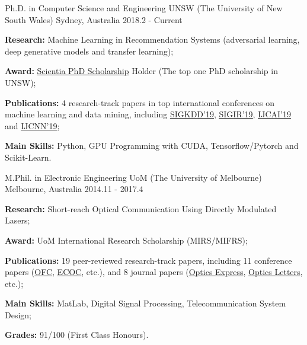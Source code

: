 

\begin{cventries}

  \cventry
    {Ph.D. in Computer Science and Engineering} %
    {UNSW (The University of New South Wales)} %
    {Sydney, Australia} %
    {2018.2 - Current} %
    {
      \begin{cvitems} %
        \item \textbf{Research:} Machine Learning in Recommendation Systems (adversarial learning, deep generative models and transfer learning);
        \item \textbf{Award:} \href{https://www.scientia.unsw.edu.au/scientia-phd-scholarships}{\underline{Scientia PhD Scholarship}} Holder (The top one PhD scholarship in UNSW);
        \item \textbf{Publications:}  4 research-track papers in top international conferences on machine learning and data mining, including \href{https://www.kdd.org/kdd2019/}{\underline{SIGKDD'19}}, \href{https://sigir.org/sigir2019/}{\underline{SIGIR'19}}, \href{https://ijcai19.org/}{\underline{IJCAI'19}} and \href{https://www.ijcnn.org/}{\underline{IJCNN'19}};
        \item \textbf{Main Skills:} Python, GPU Programming with CUDA, Tensorflow/Pytorch and Scikit-Learn.
      \end{cvitems}
    }

  \cventry%
    {M.Phil. in Electronic Engineering}%
    {UoM (The University of Melbourne)}%
    {Melbourne, Australia}%
    {2014.11 - 2017.4}%
    {
      \begin{cvitems}
        \item \textbf{Research:} Short-reach Optical Communication Using Directly Modulated Lasers;
        \item \textbf{Award:} UoM International Research Scholarship (MIRS/MIFRS);
        \item \textbf{Publications:} 19 peer-reviewed research-track papers, including 11 conference papers (\href{https://www.ofcconference.org/en-us/home/}{OFC}, \href{https://www.ecocexhibition.com/conference/}{ECOC}, etc.), and 8 journal papers (\href{https://www.osapublishing.org/oe/home.cfm}{Optics Express}, \href{https://www.osapublishing.org/ol/home.cfm}{Optics Letters}, etc.);
        \item \textbf{Main Skills:} MatLab, Digital Signal Processing, Telecommunication System Design;
        \item \textbf{Grades:} 91/100 (First Class Honours).
      \end{cvitems}
    }


\end{cventries}
